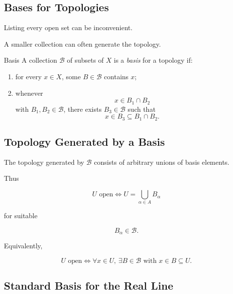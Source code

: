\subsection{Bases for Topologies}
\label{subsec:topological-bases}

Listing every open set can be inconvenient.

A smaller collection can often generate the topology.

\begin{definitionbox}{Basis}
A collection \(\mathcal{B}\) of subsets of \(X\) is a \emph{basis} for a
topology if:

\begin{enumerate}
    \item for every \(x\in X\), some \(B\in\mathcal{B}\) contains \(x\);

    \item whenever
    \[
    x\in B_1\cap B_2
    \]
    with \(B_1,B_2\in\mathcal{B}\), there exists \(B_3\in\mathcal{B}\)
    such that
    \[
    x\in B_3\subseteq B_1\cap B_2.
    \]
\end{enumerate}
\end{definitionbox}

\subsection{Topology Generated by a Basis}
\label{subsec:topology-generated-by-basis}

The topology generated by \(\mathcal{B}\) consists of arbitrary unions of
basis elements.

Thus

\[
\boxed{
U\text{ open}
\iff
U=\bigcup_{\alpha\in A}B_\alpha
}
\]

for suitable

\[
B_\alpha\in\mathcal{B}.
\]

Equivalently,

\[
\boxed{
U\text{ open}
\iff
\forall x\in U,\
\exists B\in\mathcal{B}
\text{ with }
x\in B\subseteq U.
}
\]

\subsection{Standard Basis for the Real Line}
\label{subsec:standard-basis-real-line}


